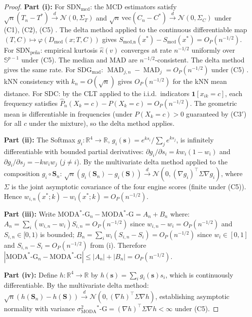 \documentclass[11pt]{article}
\theoremstyle{plain}
\theoremstyle{definition}
\DeclareMathOperator{\MAD}{MAD}
\newcommand{\R}{\mathbb{R}}
\newcommand{\indist}{\xrightarrow{d}}
\newcommand{\moda}{\text{MODA}^*\text{-G}}
\begin{document}
\begin{proof}
\textbf{Part (i):}
For SDN$_\text{mcd}$: the MCD estimators satisfy
$\sqrt{n}(T_n - T^*) \indist \mathcal{N}(0, \Sigma_T)$
and $\sqrt{n}\,\mathrm{vec}(C_n - C^*) \indist
\mathcal{N}(0, \Sigma_C)$ under (C1), (C2), (C5)
\citep{rousseeuw1999}. The delta method applied to the
continuous differentiable map
$(T, C) \mapsto \varphi(D_\text{mcd}(x; T, C))$ gives
$S_\text{mcd,n}(x^*) - S_\text{mcd}(x^*) =
O_P(n^{-1/2})$.
For SDN$_\text{pe\~{n}a}$: empirical kurtosis
$\hat{\kappa}(v)$ converges at rate $n^{-1/2}$
uniformly over $\mathbb{S}^{p-1}$ under (C5). The
median and MAD are $n^{-1/2}$-consistent. The delta
method gives the same rate.
For SDG$_\text{mad}$: $\MAD_{j,n} - \MAD_j =
O_P(n^{-1/2})$ under (C5) \citep{rousseeuw2018}.
kNN consistency with $k_n = O(\sqrt{n})$ gives
$O_P(n^{-1/2})$ for the kNN mean distance.
For SDC: by the CLT applied to the i.i.d.\ indicators
$\mathbf{1}[x_{ik} = c]$, each frequency satisfies
$\hat{P}_n(X_k = c) - P(X_k = c) = O_P(n^{-1/2})$.
The geometric mean is differentiable in frequencies
(under $P(X_k = c) > 0$ guaranteed by (C3$'$) for all
$c$ under the mixture), so the delta method applies.

\textbf{Part (ii):}
The Softmax $g_i : \R^4 \to \R$,
$g_i(\mathbf{s}) = e^{ks_i}/\sum_j e^{ks_j}$,
is infinitely differentiable with bounded partial
derivatives:
$\partial g_i/\partial s_i = k w_i(1 - w_i)$ and
$\partial g_i/\partial s_j = -k w_i w_j$ ($j \neq i$).
By the multivariate delta method applied to the
composition $g_i \circ \mathbf{S}_n$:
$\sqrt{n}(g_i(\mathbf{S}_n) - g_i(\mathbf{S}))
\indist \mathcal{N}(0, (\nabla g_i)^\top \Sigma
\nabla g_i)$,
where $\Sigma$ is the joint asymptotic covariance of
the four engine scores (finite under (C5)).
Hence $w_{i,n}(x^*;k) - w_i(x^*;k) = O_P(n^{-1/2})$.

\textbf{Part (iii):}
Write $\moda_n - \moda = A_n + B_n$ where:
$A_n = \sum_i (w_{i,n} - w_i) S_{i,n}
= O_P(n^{-1/2})$
since $w_{i,n} - w_i = O_P(n^{-1/2})$ and $S_{i,n}
\in [0,1)$ is bounded;
$B_n = \sum_i w_i (S_{i,n} - S_i)
= O_P(n^{-1/2})$
since $w_i \in [0,1]$ and $S_{i,n} - S_i =
O_P(n^{-1/2})$ from (i).
Therefore $|\moda_n - \moda| \leq |A_n| + |B_n| =
O_P(n^{-1/2})$.

\textbf{Part (iv):}
Define $h : \R^4 \to \R$ by $h(\mathbf{s}) =
\sum_i g_i(\mathbf{s}) s_i$, which is continuously
differentiable. By the multivariate delta method:
$\sqrt{n}(h(\mathbf{S}_n) - h(\mathbf{S}))
\indist \mathcal{N}(0, (\nabla h)^\top \Sigma
\nabla h)$,
establishing asymptotic normality with variance
$\sigma^2_\moda = (\nabla h)^\top \Sigma \nabla h
< \infty$ under (C5).
\end{proof}
\end{document}

